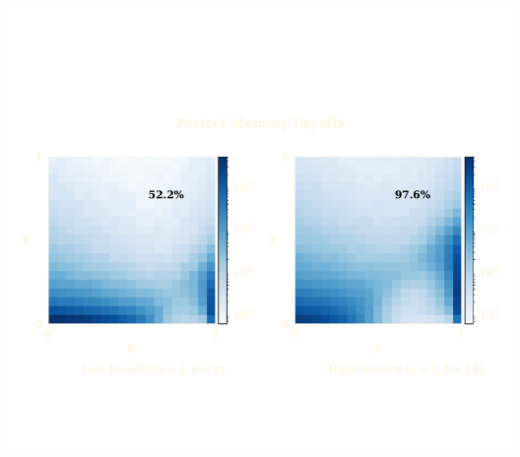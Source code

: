\documentclass{beamer}
\begin{document}
\begin{frame}
    \centering
    \includegraphics[width=\textwidth]{static/results_one.pdf}
\end{frame}

\begin{frame}
    \centering
    
\end{frame}

\begin{frame}
    \centering
    
\end{frame}

\begin{frame}
    \centering
    
\end{frame}

\begin{frame}
    \centering
    
\end{frame}
\end{document}
